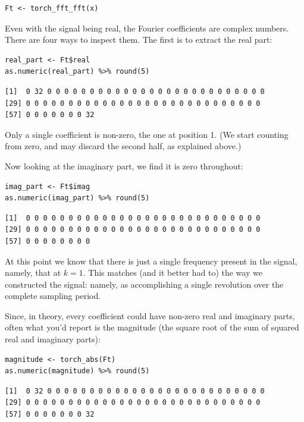\documentclass[
  letterpaper,
]{krantz}
\begin{document}
\begin{verbatim}
Ft <- torch_fft_fft(x)
\end{verbatim}

Even with the signal being real, the Fourier coefficients are complex
numbers. There are four ways to inspect them. The first is to extract
the real part:

\begin{verbatim}
real_part <- Ft$real
as.numeric(real_part) %>% round(5)
\end{verbatim}

\begin{verbatim}
[1]  0 32 0 0 0 0 0 0 0 0 0 0 0 0 0 0 0 0 0 0 0 0 0 0 0 0 0 0
[29] 0 0 0 0 0 0 0 0 0 0 0 0 0 0 0 0 0 0 0 0 0 0 0 0 0 0 0 0 
[57] 0 0 0 0 0 0 0 32
\end{verbatim}

Only a single coefficient is non-zero, the one at position 1. (We start
counting from zero, and may discard the second half, as explained
above.)

Now looking at the imaginary part, we find it is zero throughout:

\begin{verbatim}
imag_part <- Ft$imag
as.numeric(imag_part) %>% round(5)
\end{verbatim}

\begin{verbatim}
[1]  0 0 0 0 0 0 0 0 0 0 0 0 0 0 0 0 0 0 0 0 0 0 0 0 0 0 0 0
[29] 0 0 0 0 0 0 0 0 0 0 0 0 0 0 0 0 0 0 0 0 0 0 0 0 0 0 0 0
[57] 0 0 0 0 0 0 0 0
\end{verbatim}

At this point we know that there is just a single frequency present in
the signal, namely, that at \(k = 1\). This matches (and it better had
to) the way we constructed the signal: namely, as accomplishing a single
revolution over the complete sampling period.

Since, in theory, every coefficient could have non-zero real and
imaginary parts, often what you'd report is the magnitude (the square
root of the sum of squared real and imaginary parts):

\begin{verbatim}
magnitude <- torch_abs(Ft)
as.numeric(magnitude) %>% round(5)
\end{verbatim}

\begin{verbatim}
[1]  0 32 0 0 0 0 0 0 0 0 0 0 0 0 0 0 0 0 0 0 0 0 0 0 0 0 0 0
[29] 0 0 0 0 0 0 0 0 0 0 0 0 0 0 0 0 0 0 0 0 0 0 0 0 0 0 0 0 
[57] 0 0 0 0 0 0 0 32
\end{verbatim}
\end{document}
